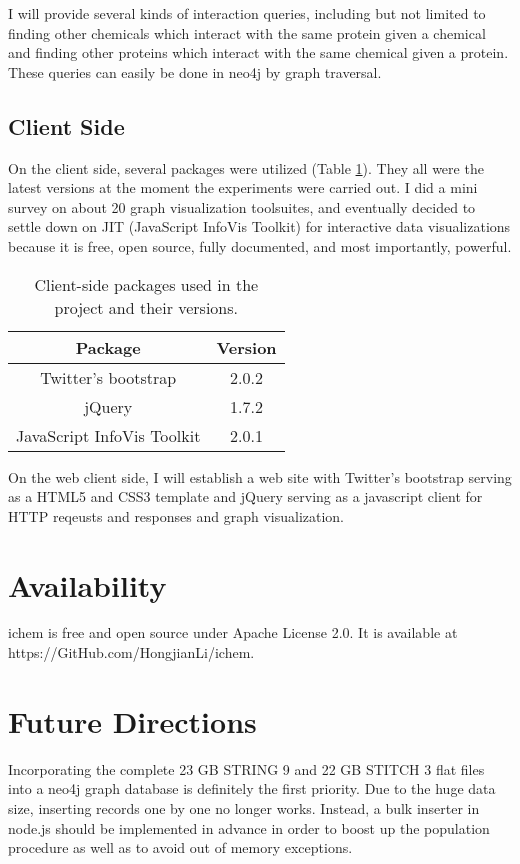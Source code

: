 \documentclass[10pt,conference,compsocconf]{../IEEEtran}
\begin{document}
I will provide several kinds of interaction queries, including but not limited to finding other chemicals which interact with the same protein given a chemical and finding other proteins which interact with the same chemical given a protein. These queries can easily be done in neo4j by graph traversal.

\subsection{Client Side}

On the client side, several packages were utilized (Table \ref{tab:clientpackages}). They all were the latest versions at the moment the experiments were carried out. I did a mini survey on about 20 graph visualization toolsuites, and eventually decided to settle down on JIT (JavaScript InfoVis Toolkit) for interactive data visualizations because it is free, open source, fully documented, and most importantly, powerful.

\begin{table}
\centering
\begin{tabular*}
{\linewidth}
{@{\extracolsep{\fill}}cc}
\toprule
Package & Version\\
\midrule
Twitter's bootstrap & 2.0.2\\
jQuery & 1.7.2\\
JavaScript InfoVis Toolkit & 2.0.1\\
\bottomrule
\end{tabular*}
\caption{Client-side packages used in the project and their versions.}
\label{tab:clientpackages}
\end{table}

On the web client side, I will establish a web site with Twitter's bootstrap serving as a HTML5 and CSS3 template and jQuery serving as a javascript client for HTTP reqeusts and responses and graph visualization.

\section{Availability}

ichem is free and open source under Apache License 2.0. It is available at https://GitHub.com/HongjianLi/ichem.

\section{Future Directions}

Incorporating the complete 23 GB STRING 9 and 22 GB STITCH 3 flat files into a neo4j graph database is definitely the first priority. Due to the huge data size, inserting records one by one no longer works. Instead, a bulk inserter in node.js should be implemented in advance in order to boost up the population procedure as well as to avoid out of memory exceptions.
\end{document}
